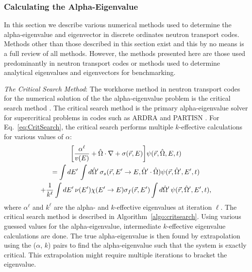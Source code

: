 \subsubsection{Calculating the Alpha-Eigenvalue}
\label{sec:CalcAlpha}

In this section we describe various numerical methods used to determine the alpha-eigenvalue and eigenvector in discrete ordinates neutron transport codes. 
Methods other than those described in this section exist and this by no means is a full review of all methods. However, the methods presented here are those used predominantly in neutron transport codes or methods used to determine analytical eigenvalues and eigenvectors for benchmarking.

\textit{The Critical Search Method}: The workhorse method in neutron transport codes for the numerical solution of the the alpha-eigenvalue problem is the critical search method \cite{hill_efficient_1983}. The critical search method is the primary alpha-eigenvalue solver for supercritical problems in codes such as ARDRA \cite{hanebutte_ardra_1999} and PARTISN \cite{alcouffe2005partisn}. For Eq.~\ref{eq:CritSearch}, the critical search performs multiple $k$-effective calculations for various values of $\alpha$:
\begin{multline}
	\bigg [ \frac{\alpha^{\ell}}{v(E)}  + \hat{\Omega} \cdot \nabla + \sigma(\vec{r},E) \bigg ] \psi(\vec{r},\hat{\Omega},E,t) \\ = \int \mathop{}\!d E' \, \int \mathop{}\!d \hat{\Omega}' \, \sigma_{s}(\vec{r},E'\rightarrow E,\hat{\Omega}' \cdot \hat{\Omega}) \psi(\vec{r},\hat{\Omega}',E',t) \\ + \frac{1}{k^{\ell}}\int \mathop{}\!d E' \, \nu(E') \chi(E'\rightarrow E) \sigma_{f}(\vec{r},E') \int \mathop{}\!d \hat{\Omega}' \, \psi(\vec{r},\hat{\Omega}',E',t), 
	\label{eq:CritSearch}
\end{multline}
where $\alpha^{\ell}$ and $k^{\ell}$ are the alpha- and $k$-effective eigenvalues at iteration $\ell$.
The critical search method is described in Algorithm~\ref{algo:critsearch}. Using various guessed values for the alpha-eigenvalue, intermediate $k$-effective eigenvalue calculations are done. The true alpha-eigenvalue is then found by extrapolation using the ($\alpha$, $k$) pairs to find the alpha-eigenvalue such that the system is exactly critical. This extrapolation might require multiple iterations to bracket the eigenvalue. 

